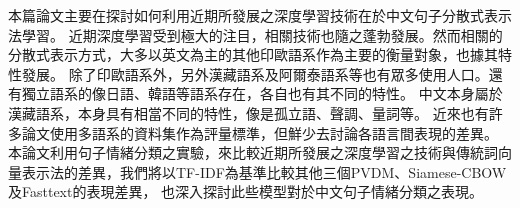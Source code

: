 \begin{abstractCH}

本篇論文主要在探討如何利用近期所發展之深度學習技術在於中文句子分散式表示法學習。 
近期深度學習受到極大的注目，相關技術也隨之蓬勃發展。然而相關的分散式表示方式，大多以英文為主的其他印歐語系作為主要的衡量對象，也據其特性發展。 
除了印歐語系外，另外漢藏語系及阿爾泰語系等也有眾多使用人口。還有獨立語系的像日語、韓語等語系存在，各自也有其不同的特性。
中文本身屬於漢藏語系，本身具有相當不同的特性，像是孤立語、聲調、量詞等。
近來也有許多論文使用多語系的資料集作為評量標準，但鮮少去討論各語言間表現的差異。\\

本論文利用句子情緒分類之實驗，來比較近期所發展之深度學習之技術與傳統詞向量表示法的差異，我們將以TF-IDF為基準比較其他三個PVDM、Siamese-CBOW及Fasttext的表現差異，
也深入探討此些模型對於中文句子情緒分類之表現。

\end{abstractCH}

